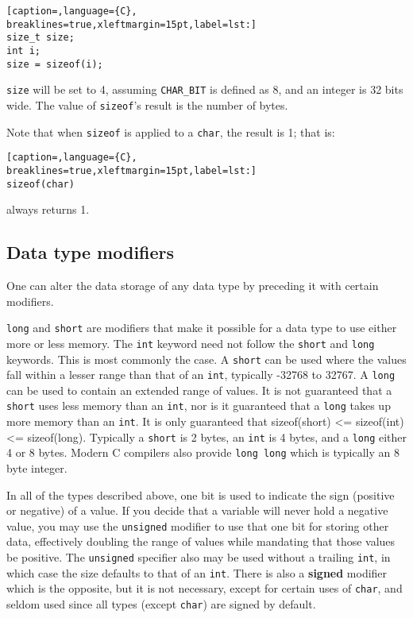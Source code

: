 \lstset{basicstyle=\scriptsize, numbers=left, captionpos=b, tabsize=4}
\begin{lstlisting}[caption=,language={C},
breaklines=true,xleftmargin=15pt,label=lst:]
size_t size;
int i;
size = sizeof(i);
\end{lstlisting}

\texttt{size} will be set to 4, assuming \texttt{CHAR\_BIT} is defined as 8,
and an integer is 32 bits wide. The value of \texttt{sizeof}'s result is the
number of bytes.

Note that when \texttt{sizeof} is applied to a \texttt{char}, the result is 1;
that is:

\lstset{basicstyle=\scriptsize, numbers=left, captionpos=b, tabsize=4}
\begin{lstlisting}[caption=,language={C},
breaklines=true,xleftmargin=15pt,label=lst:]
sizeof(char)
\end{lstlisting}

always returns 1.

\subsection{Data type modifiers}
One can alter the data storage of any data type by preceding it with certain
modifiers.

\texttt{long} and \texttt{short} are modifiers that make it possible for a data
type to use either more or less memory. The \texttt{int} keyword need not
follow the \texttt{short} and \texttt{long} keywords. This is most commonly the
case. A \texttt{short} can be used where the values fall within a lesser range
than that of an \texttt{int}, typically -32768 to 32767. A \texttt{long} can be
used to contain an extended range of values. It is not guaranteed that a
\texttt{short} uses less memory than an \texttt{int}, nor is it guaranteed that
a \texttt{long} takes up more memory than an \texttt{int}. It is only
guaranteed that sizeof(short) \textless{}= sizeof(int) \textless{}=
sizeof(long). Typically a \texttt{short} is 2 bytes, an \texttt{int} is 4
bytes, and a \texttt{long} either 4 or 8 bytes. Modern C compilers also provide
\texttt{long long} which is
typically an 8 byte integer. 

In all of the types described above, one bit is used to indicate the sign
(positive or negative) of a value. If you decide that a variable will never
hold a negative value, you may use the \texttt{unsigned} modifier to use that
one bit for storing other data, effectively doubling the range of values while
mandating that those values be positive. The \texttt{unsigned} specifier also
may be used without a trailing \texttt{int}, in which case the size defaults to
that of an \texttt{int}. There is also a \textbf{signed} modifier which is the
opposite, but it is not necessary, except for certain uses of \texttt{char},
and seldom used since all types (except \texttt{char}) are signed by default.

